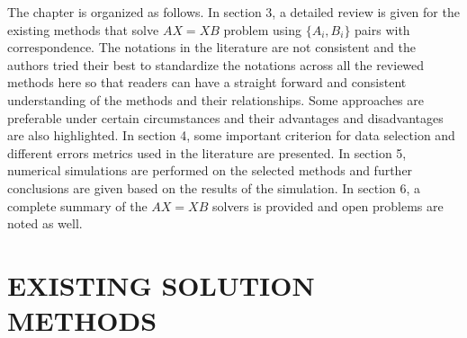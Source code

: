 \documentclass[twocolumn,10pt]{asme2ej}
\begin{document}
%
%
The chapter is organized as follows. 
In section 3, a detailed review is given for the existing methods that solve $AX=XB$ problem using $\{A_{i}, B_{i}\}$ pairs with correspondence. The notations in the literature are not consistent and the authors tried their best to standardize the notations across all the reviewed methods here so that readers can have a straight forward and consistent understanding of the methods and their relationships. Some approaches are preferable under certain circumstances and their advantages and disadvantages are also highlighted. 
In section 4, some important criterion for data selection and different errors metrics used in the literature are presented. 
In section 5, numerical simulations are performed on the selected methods and further conclusions are given based on the results of the simulation. In section 6, a complete summary of the $AX=XB$ solvers is provided and open problems are noted as well.    

\section{EXISTING SOLUTION METHODS}
 
\end{document}
